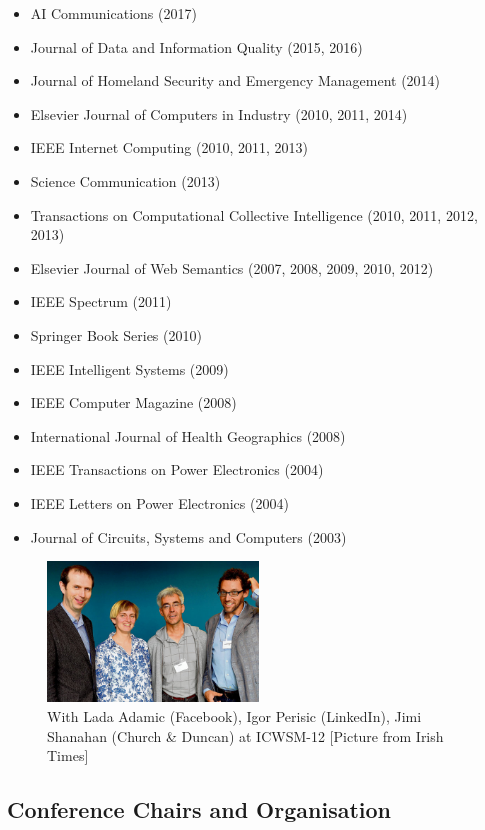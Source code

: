 \documentclass[10pt,a4paper]{res} %
\begin{document}
\begin{resume}
\begin{itemize} \itemsep -2pt
\item AI Communications (2017)
\item Journal of Data and Information Quality (2015, 2016)
\item Journal of Homeland Security and Emergency Management (2014)
\item Elsevier Journal of Computers in Industry (2010, 2011, 2014)
\item IEEE Internet Computing (2010, 2011, 2013)
\item Science Communication (2013)
\item Transactions on Computational Collective Intelligence (2010, 2011, 2012, 2013)
\item Elsevier Journal of Web Semantics (2007, 2008, 2009, 2010, 2012)
\item IEEE Spectrum (2011)
\item Springer Book Series (2010)
\item IEEE Intelligent Systems (2009)
\item IEEE Computer Magazine (2008)
\item International Journal of Health Geographics (2008)
\item IEEE Transactions on Power Electronics (2004)
\item IEEE Letters on Power Electronics (2004)
\item Journal of Circuits, Systems and Computers (2003)
\end{itemize}

\begin{figure}[htbp]
\begin{center}
\includegraphics[width=0.5\textwidth]{figures/ICWSM.jpg}
\end{center}
\caption{With Lada Adamic (Facebook), Igor Perisic (LinkedIn), Jimi Shanahan (Church \& Duncan) at ICWSM-12 [Picture from Irish Times]}
\end{figure}

\subsection*{Conference Chairs and Organisation}


\end{resume}
\end{document}
